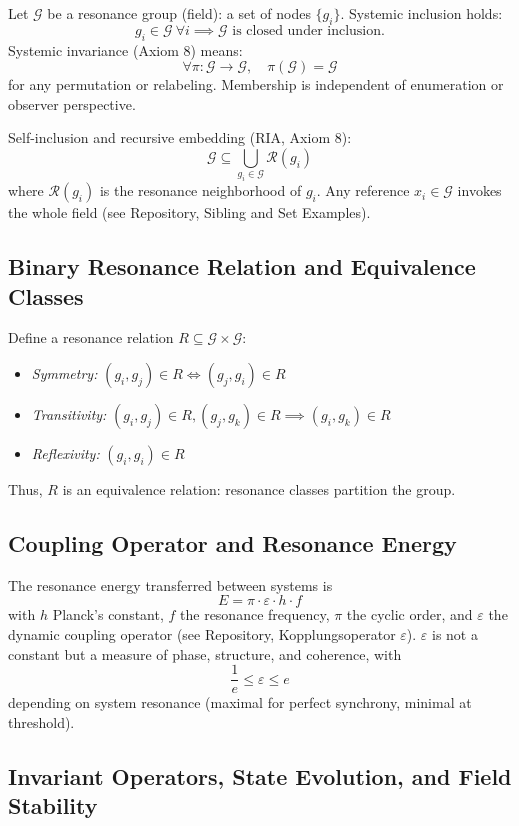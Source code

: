 \documentclass[12pt]{iopart}
\begin{document}
Let $\mathcal{G}$ be a resonance group (field): a set of nodes $\{g_i\}$. Systemic inclusion holds:
\[
g_i \in \mathcal{G}\ \forall i \implies \mathcal{G} \text{ is closed under inclusion.}
\]
Systemic invariance (Axiom 8) means:
\[
\forall \pi : \mathcal{G} \to \mathcal{G},\quad \pi(\mathcal{G}) = \mathcal{G}
\]
for any permutation or relabeling. Membership is independent of enumeration or observer perspective.

Self-inclusion and recursive embedding (RIA, Axiom 8):
\[
\mathcal{G} \subseteq \bigcup_{g_i \in \mathcal{G}} \mathcal{R}(g_i)
\]
where $\mathcal{R}(g_i)$ is the resonance neighborhood of $g_i$. Any reference $x_i \in \mathcal{G}$ invokes the whole field (see Repository, Sibling and Set Examples).

\subsection{Binary Resonance Relation and Equivalence Classes}

Define a resonance relation $R \subseteq \mathcal{G} \times \mathcal{G}$:
\begin{itemize}
	\item \textit{Symmetry:} $(g_i, g_j) \in R \iff (g_j, g_i) \in R$
	\item \textit{Transitivity:} $(g_i, g_j) \in R, (g_j, g_k) \in R \implies (g_i, g_k) \in R$
	\item \textit{Reflexivity:} $(g_i, g_i) \in R$
\end{itemize}
Thus, $R$ is an equivalence relation: resonance classes partition the group.

\subsection{Coupling Operator and Resonance Energy}

The resonance energy transferred between systems is
\[
E = \pi \cdot \varepsilon \cdot h \cdot f
\]
with $h$ Planck's constant, $f$ the resonance frequency, $\pi$ the cyclic order, and $\varepsilon$ the dynamic coupling operator (see Repository, Kopplungsoperator $\varepsilon$). $\varepsilon$ is not a constant but a measure of phase, structure, and coherence, with
\[
\frac{1}{e} \leq \varepsilon \leq e
\]
depending on system resonance (maximal for perfect synchrony, minimal at threshold).

\subsection{Invariant Operators, State Evolution, and Field Stability}
\end{document}
